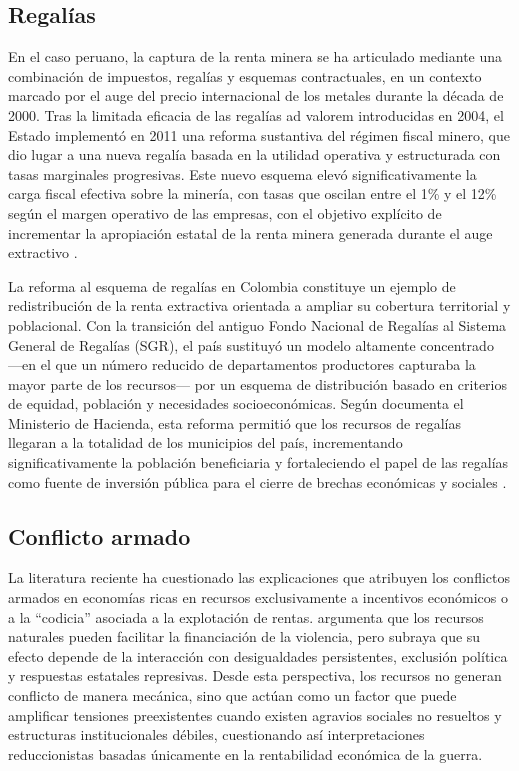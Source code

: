 \documentclass[../../PTFM.tex]{subfiles}
\begin{document}
	\subsection{Regalías}
	\label{subsec:regalias}
	
	En el caso peruano, la captura de la renta minera se ha articulado mediante una combinación de impuestos, regalías y esquemas contractuales, en un contexto marcado por el auge del precio internacional de los metales durante la década de 2000. Tras la limitada eficacia de las regalías ad valorem introducidas en 2004, el Estado implementó en 2011 una reforma sustantiva del régimen fiscal minero, que dio lugar a una nueva regalía basada en la utilidad operativa y estructurada con tasas marginales progresivas. Este nuevo esquema elevó significativamente la carga fiscal efectiva sobre la minería, con tasas que oscilan entre el 1\% y el 12\% según el margen operativo de las empresas, con el objetivo explícito de incrementar la apropiación estatal de la renta minera generada durante el auge extractivo \parencite{TorresCuzcano2018}.
	
	La reforma al esquema de regalías en Colombia constituye un ejemplo de redistribución de la renta extractiva orientada a ampliar su cobertura territorial y poblacional. Con la transición del antiguo Fondo Nacional de Regalías al Sistema General de Regalías (SGR), el país sustituyó un modelo altamente concentrado —en el que un número reducido de departamentos productores capturaba la mayor parte de los recursos— por un esquema de distribución basado en criterios de equidad, población y necesidades socioeconómicas. Según documenta el Ministerio de Hacienda, esta reforma permitió que los recursos de regalías llegaran a la totalidad de los municipios del país, incrementando significativamente la población beneficiaria y fortaleciendo el papel de las regalías como fuente de inversión pública para el cierre de brechas económicas y sociales \parencite{MaraRamrez2018}.
	
	\subsection{Conflicto armado}
	\label{subsec:conflicto}
	
	La literatura reciente ha cuestionado las explicaciones que atribuyen los conflictos armados en economías ricas en recursos exclusivamente a incentivos económicos o a la “codicia” asociada a la explotación de rentas. \textcite{Keen2012} argumenta que los recursos naturales pueden facilitar la financiación de la violencia, pero subraya que su efecto depende de la interacción con desigualdades persistentes, exclusión política y respuestas estatales represivas. Desde esta perspectiva, los recursos no generan conflicto de manera mecánica, sino que actúan como un factor que puede amplificar tensiones preexistentes cuando existen agravios sociales no resueltos y estructuras institucionales débiles, cuestionando así interpretaciones reduccionistas basadas únicamente en la rentabilidad económica de la guerra.
	
\end{document}
